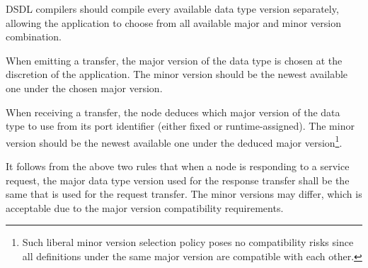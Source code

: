 DSDL compilers should compile every available data type version separately,
allowing the application to choose from all available major and minor version combination.

When emitting a transfer, the major version of the data type is chosen at the discretion of the application.
The minor version should be the newest available one under the chosen major version.

When receiving a transfer, the node deduces which major version of the data type to use
from its port identifier (either fixed or runtime-assigned).
The minor version should be the newest available one under the deduced major version\footnote{%
Such liberal minor version selection policy poses no compatibility risks since all definitions under the same
major version are compatible with each other.}.

It follows from the above two rules that when a node is responding to a service request,
the major data type version used for the response transfer shall be the same that is used for the request transfer.
The minor versions may differ, which is acceptable due to the major version compatibility requirements.


